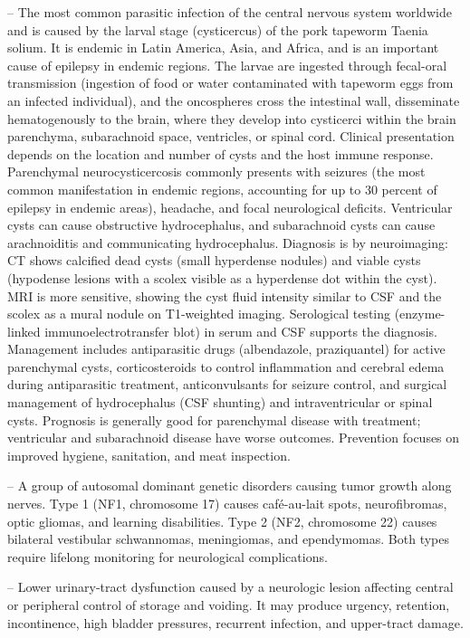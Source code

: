 -- The most common parasitic infection of the central nervous system worldwide and is caused by the larval stage (cysticercus) of the pork tapeworm Taenia solium. It is endemic in Latin America, Asia, and Africa, and is an important cause of epilepsy in endemic regions. The larvae are ingested through fecal-oral transmission (ingestion of food or water contaminated with tapeworm eggs from an infected individual), and the oncospheres cross the intestinal wall, disseminate hematogenously to the brain, where they develop into cysticerci within the brain parenchyma, subarachnoid space, ventricles, or spinal cord. Clinical presentation depends on the location and number of cysts and the host immune response. Parenchymal neurocysticercosis commonly presents with seizures (the most common manifestation in endemic regions, accounting for up to 30 percent of epilepsy in endemic areas), headache, and focal neurological deficits. Ventricular cysts can cause obstructive hydrocephalus, and subarachnoid cysts can cause arachnoiditis and communicating hydrocephalus. Diagnosis is by neuroimaging: CT shows calcified dead cysts (small hyperdense nodules) and viable cysts (hypodense lesions with a scolex visible as a hyperdense dot within the cyst). MRI is more sensitive, showing the cyst fluid intensity similar to CSF and the scolex as a mural nodule on T1-weighted imaging. Serological testing (enzyme-linked immunoelectrotransfer blot) in serum and CSF supports the diagnosis. Management includes antiparasitic drugs (albendazole, praziquantel) for active parenchymal cysts, corticosteroids to control inflammation and cerebral edema during antiparasitic treatment, anticonvulsants for seizure control, and surgical management of hydrocephalus (CSF shunting) and intraventricular or spinal cysts. Prognosis is generally good for parenchymal disease with treatment; ventricular and subarachnoid disease have worse outcomes. Prevention focuses on improved hygiene, sanitation, and meat inspection.

-- A group of autosomal dominant genetic disorders causing tumor growth along nerves. Type 1 (NF1, chromosome 17) causes café-au-lait spots, neurofibromas, optic gliomas, and learning disabilities. Type 2 (NF2, chromosome 22) causes bilateral vestibular schwannomas, meningiomas, and ependymomas. Both types require lifelong monitoring for neurological complications.

-- Lower urinary-tract dysfunction caused by a neurologic lesion affecting central or peripheral control of storage and voiding. It may produce urgency, retention, incontinence, high bladder pressures, recurrent infection, and upper-tract damage.

